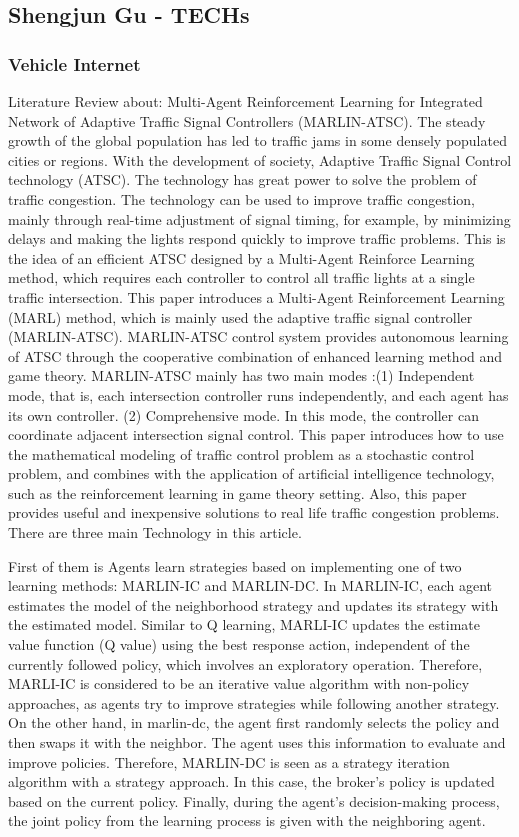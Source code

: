 \documentclass[onecolumn, draftclsnofoot,10pt, compsoc]{IEEEtran}
\begin{document}
\subsection{Shengjun Gu - TECHs}
\subsubsection{Vehicle Internet}
Literature Review about: Multi-Agent Reinforcement Learning for Integrated Network of Adaptive Traffic Signal Controllers (MARLIN-ATSC).
The steady growth of the global population has led to traffic jams in some densely populated cities or regions.
With the development of society, Adaptive Traffic Signal Control technology (ATSC).
The technology has great power to solve the problem of traffic congestion.
The technology can be used to improve traffic congestion, mainly through real-time adjustment of signal timing, for example, by minimizing delays and making the lights respond quickly to improve traffic problems.
This is the idea of an efficient ATSC designed by a Multi-Agent Reinforce Learning method, which requires each controller to control all traffic lights at a single traffic intersection.
This paper introduces a Multi-Agent Reinforcement Learning (MARL) method, which is mainly used the adaptive traffic signal controller (MARLIN-ATSC).
MARLIN-ATSC control system provides autonomous learning of ATSC through the cooperative combination of enhanced learning method and game theory.
MARLIN-ATSC mainly has two main modes :(1) Independent mode, that is, each intersection controller runs independently, and each agent has its own controller.
(2) Comprehensive mode.
In this mode, the controller can coordinate adjacent intersection signal control.
This paper introduces how to use the mathematical modeling of traffic control problem as a stochastic control problem, and combines with the application of artificial intelligence technology, such as the reinforcement learning in game theory setting.
Also, this paper provides useful and inexpensive solutions to real life traffic congestion problems.
There are three main Technology in this article.

First of them is Agents learn strategies based on implementing one of two learning methods: MARLIN-IC and MARLIN-DC.
In MARLIN-IC, each agent estimates the model of the neighborhood strategy and updates its strategy with the estimated model.
Similar to Q learning, MARLI-IC updates the estimate value function (Q value) using the best response action, independent of the currently followed policy, which involves an exploratory operation.
Therefore, MARLI-IC is considered to be an iterative value algorithm with non-policy approaches, as agents try to improve strategies while following another strategy.
On the other hand, in marlin-dc, the agent first randomly selects the policy and then swaps it with the neighbor.
The agent uses this information to evaluate and improve policies.
Therefore, MARLIN-DC is seen as a strategy iteration algorithm with a strategy approach.
In this case, the broker's policy is updated based on the current policy.
Finally, during the agent's decision-making process, the joint policy from the learning process is given with the neighboring agent.
\end{document}
